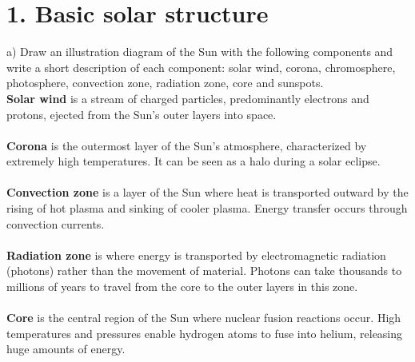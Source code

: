 \section*{1. Basic solar structure}

a) Draw an illustration diagram of the Sun with the following components and write a short description of
each component: solar wind, corona, chromosphere, photosphere, convection zone, radiation zone, core and
sunspots.\\
\noindent{}
\noindent
\textbf{Solar wind} is a stream of charged particles, predominantly electrons and protons, ejected from 
the Sun's outer layers into space.\\
\\
\textbf{Corona} is the outermost layer of the Sun's atmosphere, characterized by extremely high 
temperatures. It can be seen as a halo during a solar eclipse.\\
\\
\textbf{Convection zone} is a layer of the Sun where heat is transported outward by the rising of hot 
plasma and sinking of cooler plasma. Energy transfer occurs through convection currents.\\
\\
\textbf{Radiation zone} is where energy is transported by electromagnetic radiation (photons) rather than 
the movement of material. Photons can take thousands to millions of years to travel from the core to the 
outer layers in this zone.\\
\\
\textbf{Core} is the central region of the Sun where nuclear fusion reactions occur. High temperatures 
and pressures enable hydrogen atoms to fuse into helium, releasing huge amounts of energy.\\
